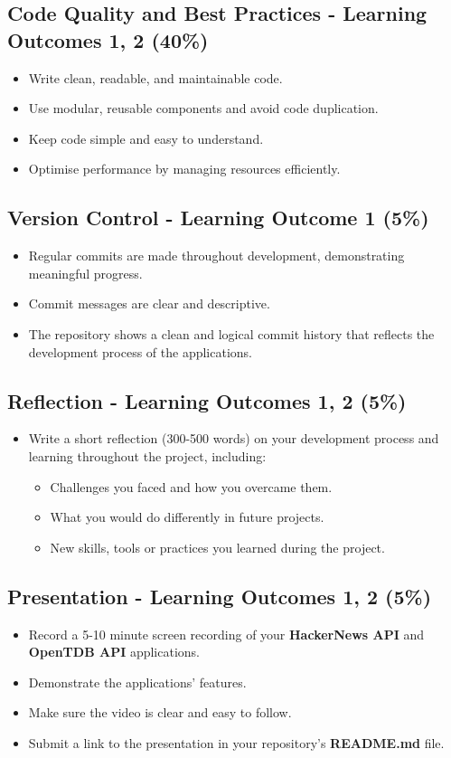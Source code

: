 \documentclass{article}
\begin{document}
	\subsection*{Code Quality and Best Practices - Learning Outcomes 1, 2 (40\%)}
	\begin{itemize}
		\item Write clean, readable, and maintainable code.
		\item Use modular, reusable components and avoid code duplication.
		\item Keep code simple and easy to understand.
		\item Optimise performance by managing resources efficiently.
	\end{itemize}
	
	\subsection*{Version Control - Learning Outcome 1 (5\%)}
	\begin{itemize}
	  \item Regular commits are made throughout development, demonstrating meaningful progress.
	  \item Commit messages are clear and descriptive.
	  \item The repository shows a clean and logical commit history that reflects the development process of the applications.
	\end{itemize} 
	
	\subsection*{Reflection - Learning Outcomes 1, 2 (5\%)}
	\begin{itemize}
	  \item Write a short reflection (300-500 words) on your development process and learning throughout the project, including:
	  \begin{itemize}
		\item Challenges you faced and how you overcame them.
		\item What you would do differently in future projects.
		\item New skills, tools or practices you learned during the project.
	  \end{itemize}
	\end{itemize}
	
	\subsection*{Presentation - Learning Outcomes 1, 2 (5\%)}
	\begin{itemize}
	  \item Record a 5-10 minute screen recording of your \textbf{HackerNews API} and \textbf{OpenTDB API} applications.
	  \item Demonstrate the applications' features.
	  \item Make sure the video is clear and easy to follow.
	  \item Submit a link to the presentation in your repository's \textbf{README.md} file.
	\end{itemize}
\end{document}
